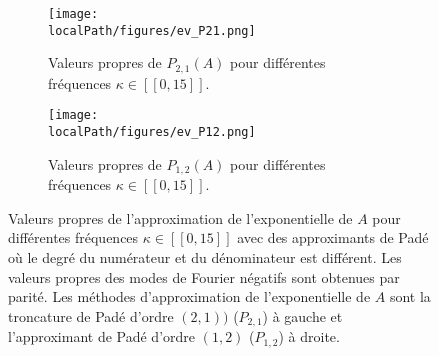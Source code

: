 \begin{figure}
  \begin{subfigure}{.5\textwidth}
    \centering
    \texttt{[image: \\localPath/figures/ev\_P21.png]}
    \caption{Valeurs propres de $P_{2,1}(A)$ pour différentes fréquences $\kappa\in[\![0,15]\!]$.}
    \label{fig:ev:P21}
  \end{subfigure}
  \begin{subfigure}{.5\textwidth}
    \texttt{[image: \\localPath/figures/ev\_P12.png]}
    \caption{Valeurs propres de $P_{1,2}(A)$ pour différentes fréquences $\kappa\in[\![0,15]\!]$.}
    \label{fig:ev:P12}
  \end{subfigure}
  \caption{Valeurs propres de l'approximation de l'exponentielle de $A$ pour différentes fréquences $\kappa\in[\![0,15]\!]$ avec des approximants de Padé où le degré du numérateur et du dénominateur est différent. Les valeurs propres des modes de Fourier négatifs sont obtenues par parité. Les méthodes d'approximation de l'exponentielle de $A$ sont la troncature de Padé d'ordre $(2,1))$ ($P_{2,1}$) à gauche et l'approximant de Padé d'ordre $(1,2)$ ($P_{1,2}$) à droite.}
\end{figure}



